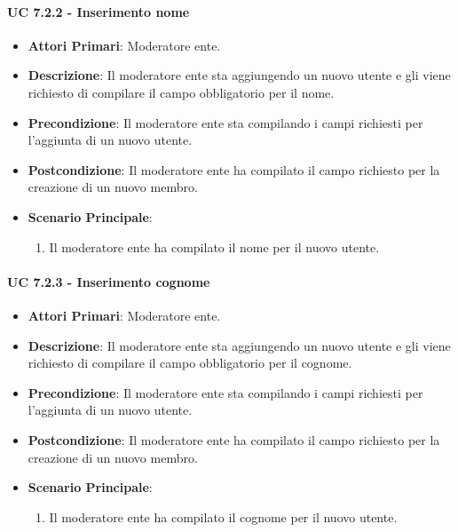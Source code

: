 			\paragraph{UC 7.2.2 - Inserimento nome}
			\begin{itemize}
				\item \textbf{Attori Primari}: Moderatore ente.
				\item \textbf{Descrizione}: Il moderatore ente sta aggiungendo un nuovo utente e gli viene richiesto di compilare il campo obbligatorio per il nome.
				\item \textbf{Precondizione}: Il moderatore ente sta compilando i campi richiesti per l'aggiunta di un nuovo utente.
				\item \textbf{Postcondizione}: Il moderatore ente ha compilato il campo richiesto per la creazione di un nuovo membro.
				\item \textbf{Scenario Principale}:
				\begin{enumerate}
					\item{Il moderatore ente ha compilato il nome per il nuovo utente.}
				\end{enumerate}	
			\end{itemize}

			\paragraph{UC 7.2.3 - Inserimento cognome}
			\begin{itemize}
				\item \textbf{Attori Primari}: Moderatore ente.
				\item \textbf{Descrizione}: Il moderatore ente sta aggiungendo un nuovo utente e gli viene richiesto di compilare il campo obbligatorio per il cognome.
				\item \textbf{Precondizione}: Il moderatore ente sta compilando i campi richiesti per l'aggiunta di un nuovo utente.
				\item \textbf{Postcondizione}: Il moderatore ente ha compilato il campo richiesto per la creazione di un nuovo membro.
				\item \textbf{Scenario Principale}:
				\begin{enumerate}
					\item{Il moderatore ente ha compilato il cognome per il nuovo utente.}
				\end{enumerate}	
			\end{itemize}

